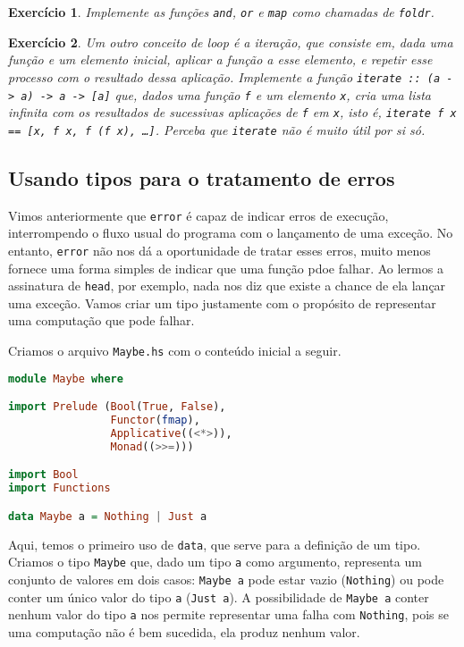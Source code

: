 \documentclass[a4paper]{article}
\newtheorem{exercicio}{Exercício}
\begin{document}
\begin{exercicio}
	Implemente as funções \emph{\texttt{and}}, \emph{\texttt{or}} e \emph{\texttt{map}} como chamadas de \emph{\texttt{foldr}}.
\end{exercicio}

\begin{exercicio} \label{exercicio:iterate}
	Um outro conceito de \emph{loop} é a iteração, que consiste em, dada uma função e um elemento inicial, aplicar a função a esse elemento, e repetir esse processo com o resultado dessa aplicação.
	Implemente a função \emph{\texttt{iterate :: (a -> a) -> a -> [a]}} que, dados uma função \emph{\texttt{f}} e um elemento \emph{\texttt{x}}, cria uma lista infinita com os resultados de sucessivas aplicações de \emph{\texttt{f}} em \emph{\texttt{x}}, isto é, \emph{\texttt{iterate f x == [x, f x, f (f x), \dots]}}.
	Perceba que \emph{\texttt{iterate}} não é muito útil por si só.
\end{exercicio}

\subsection{Usando tipos para o tratamento de erros}

Vimos anteriormente que \texttt{error} é capaz de indicar erros de execução, interrompendo o fluxo usual do programa com o lançamento de uma exceção.
No entanto, \texttt{error} não nos dá a oportunidade de tratar esses erros, muito menos fornece uma forma simples de indicar que uma função pdoe falhar.
Ao lermos a assinatura de \texttt{head}, por exemplo, nada nos diz que existe a chance de ela lançar uma exceção.
Vamos criar um tipo justamente com o propósito de representar uma computação que pode falhar.

Criamos o arquivo \texttt{Maybe.hs} com o conteúdo inicial a seguir.

\begin{lstlisting}[language=haskell, frame=single]
module Maybe where

import Prelude (Bool(True, False),
                Functor(fmap),
                Applicative((<*>)),
                Monad((>>=)))

import Bool
import Functions

data Maybe a = Nothing | Just a
\end{lstlisting}

Aqui, temos o primeiro uso de \texttt{data}, que serve para a definição de um tipo.
Criamos o tipo \texttt{Maybe} que, dado um tipo \texttt{a} como argumento, representa um conjunto de valores em dois casos: \texttt{Maybe a} pode estar vazio (\texttt{Nothing}) ou pode conter um único valor do tipo \texttt{a} (\texttt{Just a}).
A possibilidade de \texttt{Maybe a} conter nenhum valor do tipo \texttt{a} nos permite representar uma falha com \texttt{Nothing}, pois se uma computação não é bem sucedida, ela produz nenhum valor.
\end{document}
